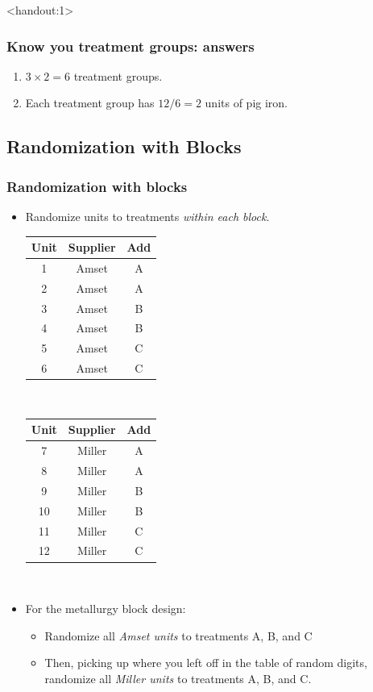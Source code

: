 \documentclass[handout]{beamer}
\newcommand{\answers}{1}
\providecommand{\q}{$\quad$ \newline}
\numberwithin{equation}{section}
\begin{document}
\begin{frame}<handout:\answers>
\frametitle{Know you treatment groups: answers}

\begin{enumerate}[1. ]
\item $3 \times 2 = 6$ treatment groups.
\pause \item Each treatment group has $12 / 6 = 2$ units of pig iron.
\end{enumerate}

\end{frame}


\subsection{Randomization with Blocks}

\begin{frame}
\frametitle{Randomization with blocks}
\small
\begin{itemize}
\item Randomize units to treatments \emph{within each block}. \q

\begin{tabular}{c|c|c}
Unit & Supplier & Add\\ \hline
1 & Amset & A \\ 
2 & Amset & A \\ 
3 & Amset & B \\ 
4 & Amset & B \\ 
5 & Amset & C \\
6 & Amset & C \\
\end{tabular} $\quad$ \begin{tabular}{c|c|c}
Unit & Supplier & Add \\ \hline
7 & Miller & A \\ 
8 & Miller & A\\ 
9 & Miller & B \\ 
10 & Miller & B \\ 
11 & Miller & C \\ 
12 & Miller & C \\ 
\end{tabular} \q

\pause \item For the metallurgy block design:

\begin{itemize}
\item Randomize all \emph{Amset units} to treatments A, B, and C
\pause \item Then, picking up where you left off in the  table of random digits,
randomize all \emph{Miller units} to treatments A, B, and C.
\end{itemize}
\end{itemize}


\end{frame}
\end{document}
